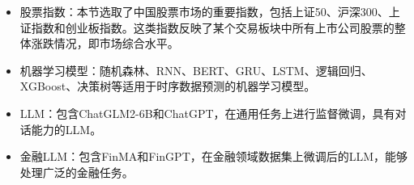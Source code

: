\begin{itemize}[topsep = 0 pt, itemsep= 0 pt, parsep=0pt, partopsep=0pt, leftmargin=36pt, itemindent=0pt, labelsep=6pt, listparindent=24pt]
	\item 股票指数：本节选取了中国股票市场的重要指数，包括上证50、沪深300、上证指数和创业板指数。这类指数反映了某个交易板块中所有上市公司股票的整体涨跌情况，即市场综合水平。
	\item 机器学习模型：随机森林\cite{DBLP:journals/pami/Ho98}、RNN\cite{rumelhart1986learning}、BERT\cite{DBLP:conf/naacl/DevlinCLT19}、GRU\cite{DBLP:conf/emnlp/ChoMGBBSB14}、LSTM\cite{DBLP:journals/neco/HochreiterS97}、逻辑回归\cite{cox1958regression}、XGBoost\cite{DBLP:conf/kdd/ChenG16}、决策树\cite{DBLP:books/mk/Quinlan93}等适用于时序数据预测的机器学习模型。
	\item LLM：包含ChatGLM2-6B\cite{DBLP:conf/iclr/ZengLDWL0YXZXTM23}和ChatGPT\cite{DBLP:conf/nips/Ouyang0JAWMZASR22}，在通用任务上进行监督微调，具有对话能力的LLM。
	\item 金融LLM：包含FinMA\cite{DBLP:journals/corr/abs-2306-05443}和FinGPT\cite{DBLP:journals/corr/abs-2306-06031}，在金融领域数据集上微调后的LLM，能够处理广泛的金融任务。
\end{itemize}

